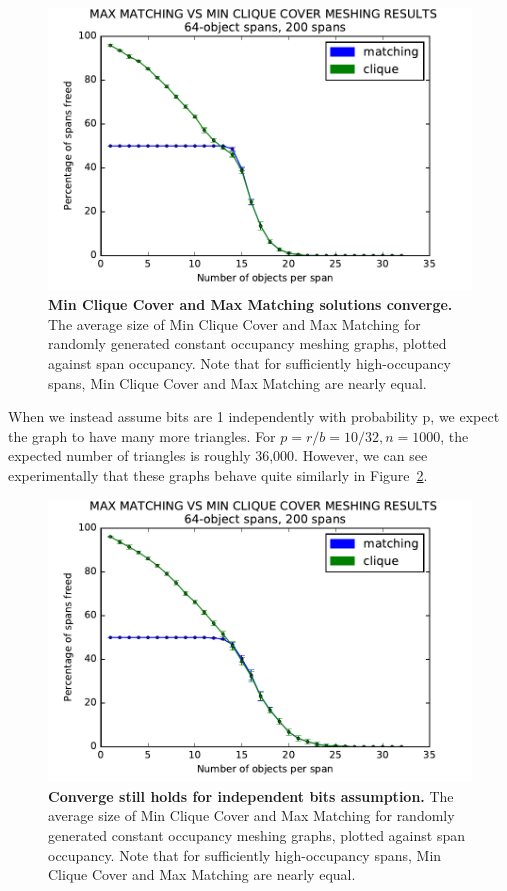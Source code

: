 \begin{figure}[h]
\includegraphics[scale = 1]{Chapters/mesh/figures/const_match_comp.pdf}
\centering
\caption{\textbf{Min Clique Cover and Max Matching solutions converge.} The average size of Min Clique Cover and Max Matching for randomly generated constant occupancy meshing graphs, plotted against span occupancy.  Note that for sufficiently high-occupancy spans, Min Clique Cover and Max Matching are nearly equal.}
\label{plot:const}
\end{figure}



When we instead assume bits are 1 independently with probability p, we expect the graph to have many more triangles.  For $p = r/b = 10/32, n = 1000$, the expected number of triangles is roughly 36,000.  However, we can see experimentally that these graphs behave quite similarly in Figure~\ref{plot:indep}.


\begin{figure}[h]
\includegraphics[scale = 1]{Chapters/mesh/figures/ind_match_comp.pdf}
\centering
\caption{\textbf{Converge still holds for independent bits assumption.} The average size of Min Clique Cover and Max Matching for randomly generated constant occupancy meshing graphs, plotted against span occupancy.  Note that for sufficiently high-occupancy spans, Min Clique Cover and Max Matching are nearly equal.}
\label{plot:indep}
\end{figure}

